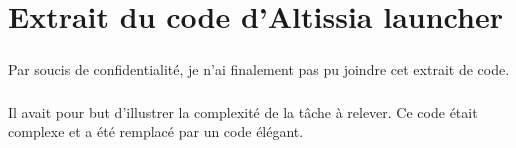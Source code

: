 \chapter{Extrait du code d'Altissia launcher}
\label{ch:altissia-launcher-code}

\paragraph{}
Par soucis de confidentialité, je n'ai finalement pas pu joindre cet extrait de code.

\paragraph{}
Il avait pour but d'illustrer la complexité de la tâche à relever.
Ce code était complexe et a été remplacé par un code élégant.
